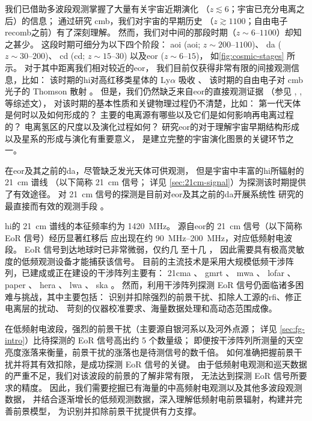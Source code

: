 我们已借助多波段观测掌握了大量有关宇宙近期演化
（$z \lesssim 6$；宇宙已充分电离之后）的信息；
通过研究 \ac{cmb}，我们对宇宙的早期历史
（$z \gtrsim 1100$；自由电子\acl{recomb}之前）有了深刻理解。
然而，我们对中间的那段时期（$z \sim \numrange{6}{1100}$）却知之甚少。
这段时期可细分为以下四个阶段\cite{koopmans2015rev}：
\acl{aoi} (\acs{aoi}; $z \sim \numrange{200}{1100}$)、
\acl{da} ($z \sim \numrange{30}{200}$)、
\acl{cd} (\acs{cd}; $z \sim \numrange{15}{30}$)
以及\acl{eor} ($z \sim \numrange{6}{15}$)，
如\autoref{fig:cosmic-stages} 所示。
对于其中距离我们相对较近的\acl{eor}，
我们目前仅获得非常有限的间接观测信息，比如：
该时期的\ac{hi}对高红移类星体的 Ly$\alpha$ 吸收 \cite{becker2001}、
该时期的自由电子对 \ac{cmb} 光子的 Thomson 散射 \cite{kaplinghat2003}。
但是，我们仍然缺乏来自\acl{eor}的直接观测证据
（参见 \textcite{fan2006rev}, \textcite{morales2010rev},
\textcite{zaroubi2013rev} 等综述文），
对该时期的基本性质和关键物理过程仍不清楚，比如：
第一代天体是何时以及如何形成的？
主要的电离源有哪些以及它们是如何影响再电离过程的？
电离氢区的尺度以及演化过程如何？
研究\acl{eor}的对于理解宇宙早期结构形成以及星系的形成与演化有重要意义，
是建立完整的宇宙演化图景的关键环节之一。

在\acl{eor}及其之前的\acl{da}，尽管缺乏发光天体可供观测，
但是宇宙中丰富的\acl{hi}所辐射的 \SI{21}{\cm} 谱线
（以下简称 \SI{21}{\cm} 信号；
详见 \autoref{sec:21cm-signal}）为探测该时期提供了有效途径。
对 \SI{21}{\cm} 信号的探测是目前对\acl{eor}及其之前的\acl{da}开展系统性
研究的最直接而有效的观测手段 \cite{koopmans2015rev,furlanetto2016rev}。

\acl{hi}的 \SI{21}{\cm} 谱线的本征频率约为 \SI{1420}{\MHz}。
源自\acl{eor}的 \SI{21}{\cm} 信号（以下简称 EoR 信号）经历显著红移后
应出现在约 \SIrange{90}{200}{\MHz}，对应低频射电波段。
EoR 信号到达地球时已非常微弱，仅约几 \si{\mK} 至十几 \si{\mK}，
因此需要具有极高灵敏度的低频观测设备才能捕获该信号。
目前的主流技术是采用大规模低频干涉阵列，已建成或正在建设的干涉阵列主要有：
\ac{21cma} \cite{zheng2016}、
\ac{gmrt} \cite{paciga2011}、
\ac{mwa} \cite{bowman2013,tingay2013}、
\ac{lofar} \cite{vanHaarlem2013}、
\ac{paper} \cite{parsons2010}、
\ac{hera} \cite{deboer2017}、
\ac{lwa} \cite{ellingson2009}、
\ac{ska} \cite{mellema2013rev,koopmans2015rev}。
然而，利用干涉阵列探测 EoR 信号仍面临诸多困难与挑战，其中主要包括：
识别并扣除强烈的前景干扰、扣除人工源的\ac{rfi}、修正电离层的扰动、
苛刻的仪器校准要求、海量数据处理和高动态范围成像。

在低频射电波段，强烈的前景干扰（主要源自银河系以及河外点源；
详见 \autoref{sec:fg-intro}）比待探测的 EoR 信号高出约 5 个数量级；
即便按干涉阵列所测量的天空亮度涨落来衡量，前景干扰的涨落也是待测信号的数千倍。
如何准确把握前景干扰并将其有效扣除，是成功探测 EoR 信号的关键。
由于低频射电观测和巡天数据的严重不足，我们对该波段的前景的了解非常有限，
无法达到探测 EoR 信号所要求的精度。
因此，我们需要挖掘已有海量的中高频射电观测以及其他多波段观测数据，
并结合逐渐增长的低频观测数据，深入理解低频射电前景辐射，构建并完善前景模型，
为识别并扣除前景干扰提供有力支撑。

